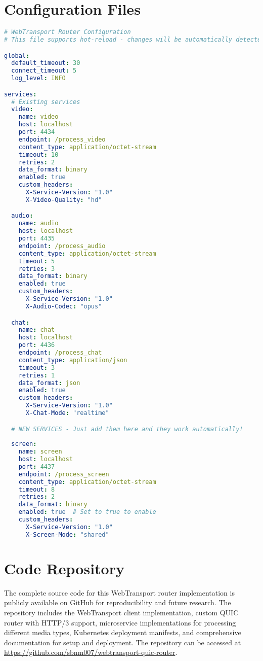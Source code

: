 \section{Configuration Files}

\begin{lstlisting}[breaklines=true, caption={Router Configuration File}, language=yaml]
# WebTransport Router Configuration
# This file supports hot-reload - changes will be automatically detected

global:
  default_timeout: 30
  connect_timeout: 5
  log_level: INFO

services:
  # Existing services
  video:
    name: video
    host: localhost
    port: 4434
    endpoint: /process_video
    content_type: application/octet-stream
    timeout: 10
    retries: 2
    data_format: binary
    enabled: true
    custom_headers:
      X-Service-Version: "1.0"
      X-Video-Quality: "hd"

  audio:
    name: audio
    host: localhost
    port: 4435
    endpoint: /process_audio
    content_type: application/octet-stream
    timeout: 5
    retries: 3
    data_format: binary
    enabled: true
    custom_headers:
      X-Service-Version: "1.0"
      X-Audio-Codec: "opus"

  chat:
    name: chat
    host: localhost
    port: 4436
    endpoint: /process_chat
    content_type: application/json
    timeout: 3
    retries: 1
    data_format: json
    enabled: true
    custom_headers:
      X-Service-Version: "1.0"
      X-Chat-Mode: "realtime"

  # NEW SERVICES - Just add them here and they work automatically!
  
  screen:
    name: screen
    host: localhost
    port: 4437
    endpoint: /process_screen
    content_type: application/octet-stream
    timeout: 8
    retries: 2
    data_format: binary
    enabled: true  # Set to true to enable  
    custom_headers:
      X-Service-Version: "1.0"
      X-Screen-Mode: "shared"
\end{lstlisting}

\section{Code Repository}
The complete source code for this WebTransport router implementation is publicly available on GitHub for reproducibility and future research. The repository includes the WebTransport client implementation, custom QUIC router with HTTP/3 support, microservice implementations for processing different media types, Kubernetes deployment manifests, and comprehensive documentation for setup and deployment. The repository can be accessed at \url{https://github.com/sbnm007/webtransport-quic-router}.


